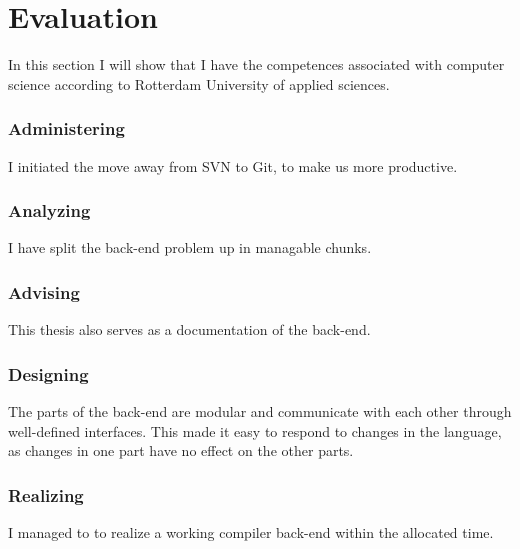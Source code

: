 \section{Evaluation}\label{evaluation}
In this section I will show that I have the competences associated with computer science according to Rotterdam University of applied sciences.

\subsubsection{Administering} 
I initiated the move away from SVN to Git, to make us more productive.

\subsubsection{Analyzing}
I have split the back-end problem up in managable chunks.

\subsubsection{Advising}
This thesis also serves as a documentation of the back-end.

\subsubsection{Designing}
The parts of the back-end are modular and communicate with each other through well-defined interfaces.
This made it easy to respond to changes in the language, as changes in one part have no effect on the other parts.

\subsubsection{Realizing}
I managed to to realize a working compiler back-end within the allocated time.
